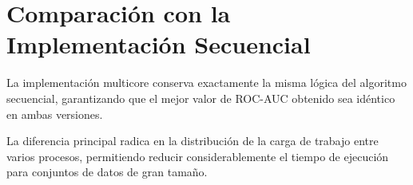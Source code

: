 \section{Comparación con la Implementación Secuencial}

La implementación multicore conserva exactamente la misma lógica del algoritmo secuencial, garantizando que el mejor valor de ROC-AUC obtenido sea idéntico en ambas versiones.

La diferencia principal radica en la distribución de la carga de trabajo entre varios procesos, permitiendo reducir considerablemente el tiempo de ejecución para conjuntos de datos de gran tamaño.